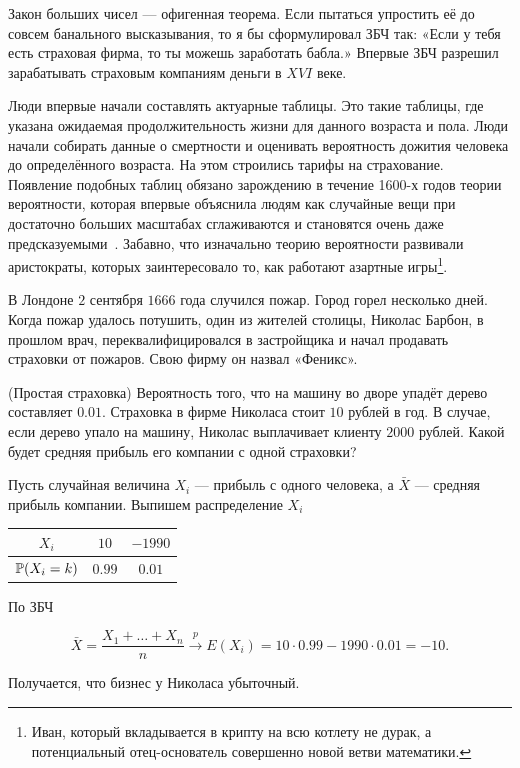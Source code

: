 \documentclass[12pt, a4paper, oneside]{article}
\begin{document}
Закон больших чисел --- офигенная теорема. Если пытаться упростить её до совсем банального высказывания, то я бы сформулировал ЗБЧ так: «Если у тебя есть страховая фирма, то ты можешь заработать бабла.» Впервые ЗБЧ разрешил зарабатывать страховым компаниям деньги в $XVI$ веке.

Люди впервые начали составлять актуарные таблицы. Это такие таблицы, где указана ожидаемая продолжительность жизни для данного возраста и пола. Люди начали собирать данные о смертности и оценивать вероятность дожития человека до определённого возраста. На этом строились тарифы на страхование. Появление подобных таблиц обязано зарождению в течение 1600-х годов теории вероятности, которая впервые объяснила людям как случайные вещи при достаточно больших масштабах сглаживаются и становятся очень даже предсказуемыми~\cite{zhlobolite}. Забавно, что изначально теорию вероятности развивали аристократы, которых заинтересовало то, как работают азартные игры\footnote{Иван, который вкладывается в крипту на всю котлету не дурак, а потенциальный отец-основатель совершенно новой ветви математики.}.

В Лондоне $2$ сентября $1666$ года случился пожар. Город горел несколько дней. Когда пожар удалось потушить, один из жителей столицы, Николас Барбон, в прошлом врач, переквалифицировался в застройщика и начал продавать страховки от пожаров. Свою фирму он назвал «Феникс». 

\begin{problem}{(Простая страховка)}
Вероятность того, что на машину во дворе упадёт дерево составляет $0.01$. Страховка в фирме Николаса стоит $10$ рублей в год. В случае, если дерево упало на машину, Николас выплачивает клиенту $2000$ рублей. Какой будет средняя прибыль его компании с одной страховки? 
\end{problem}

\begin{sol}
Пусть случайная величина $X_i$ --- прибыль с одного человека, а $\bar X$ --- средняя прибыль компании. Выпишем распределение $X_i$

\begin{center}
    \begin{tabular}{c|c|c}
    $X_i$          & $10$  & $-1990$ \\ \hline 
    $\mathbb{P}(X_i = k)$ & $0.99$ & $0.01$ 
    \end{tabular}
\end{center}

По ЗБЧ 

$$
\bar X = \frac{X_1 + \ldots + X_n}{n} \stackrel{p}{\longrightarrow} E(X_i) = 10 \cdot 0.99 - 1990 ⋅ 0.01 = −10.
$$

Получается, что бизнес у Николаса убыточный. 
\end{sol}
\end{document}
